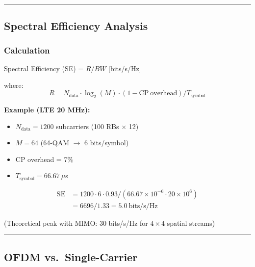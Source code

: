 \begin{center}\rule{0.5\linewidth}{0.5pt}\end{center}

\subsection{\texorpdfstring{ Spectral Efficiency
Analysis}{ Spectral Efficiency Analysis}}\label{spectral-efficiency-analysis}

\subsubsection{Calculation}\label{calculation}

Spectral Efficiency (SE) = $R / BW$ [bits/s/Hz]

where:
\begin{equation*}
R = N_{\mathrm{data}} \cdot \log_2(M) \cdot (1 - \mathrm{CP\ overhead}) / T_{\mathrm{symbol}}
\end{equation*}

\textbf{Example (LTE 20 MHz):}
\begin{itemize}
\item $N_{\mathrm{data}} = 1200$ subcarriers (100 RBs $\times$ 12)
\item $M = 64$ (64-QAM $\rightarrow$ 6 bits/symbol)
\item CP overhead = 7\%
\item $T_{\mathrm{symbol}} = 66.67\ \mu$s
\end{itemize}

\begin{align*}
\mathrm{SE} &= 1200 \cdot 6 \cdot 0.93 / (66.67 \times 10^{-6} \cdot 20 \times 10^6) \\
&= 6696 / 1.33 = 5.0\ \text{bits/s/Hz}
\end{align*}

(Theoretical peak with MIMO: 30 bits/s/Hz for $4 \times 4$ spatial streams)

\begin{center}\rule{0.5\linewidth}{0.5pt}\end{center}

\subsection{\texorpdfstring{ OFDM
vs.~Single-Carrier}{ OFDM vs.~Single-Carrier}}\label{ofdm-vs.-single-carrier}

